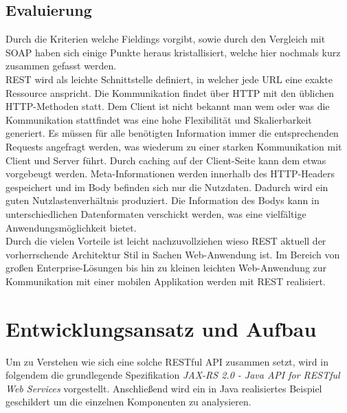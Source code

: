\documentclass[fleqn,10.5pt,ngerman]{SelfArx}
\begin{document}
\subsection{Evaluierung}
Durch die Kriterien welche Fieldings vorgibt, sowie durch den Vergleich mit SOAP haben sich einige Punkte heraus kristallisiert, welche hier nochmals kurz zusammen gefasst werden. \\ REST wird als leichte Schnittstelle definiert, in welcher jede URL eine exakte Ressource anspricht. Die Kommunikation findet über HTTP mit den üblichen HTTP-Methoden statt. Dem Client ist nicht bekannt man wem oder was die Kommunikation stattfindet was eine hohe Flexibilität und Skalierbarkeit generiert. Es müssen für alle benötigten Information immer die entsprechenden Requests angefragt werden, was wiederum zu einer starken Kommunikation mit Client und Server führt. Durch caching auf der Client-Seite kann dem etwas vorgebeugt werden. Meta-Informationen werden innerhalb des HTTP-Headers gespeichert und im Body befinden sich nur die Nutzdaten. Dadurch wird ein guten Nutzlastenverhältnis produziert. Die Information des Bodys kann in unterschiedlichen Datenformaten verschickt werden, was eine vielfältige Anwendungsmöglichkeit bietet. \\ Durch die vielen Vorteile ist leicht nachzuvollziehen wieso REST aktuell der vorherrschende Architektur Stil in Sachen Web-Anwendung ist. Im Bereich von großen Enterprise-Lösungen bis hin zu kleinen leichten Web-Anwendung zur Kommunikation mit einer mobilen Applikation werden mit REST realisiert. 

\section{Entwicklungsansatz und Aufbau}
Um zu Verstehen wie sich eine solche RESTful API zusammen setzt, wird in folgendem die grundlegende Spezifikation \textit{JAX-RS 2.0 - Java API for RESTful Web Services} vorgestellt. Anschließend wird ein in Java realisiertes Beispiel geschildert um die einzelnen Komponenten zu analysieren. 
\end{document}
